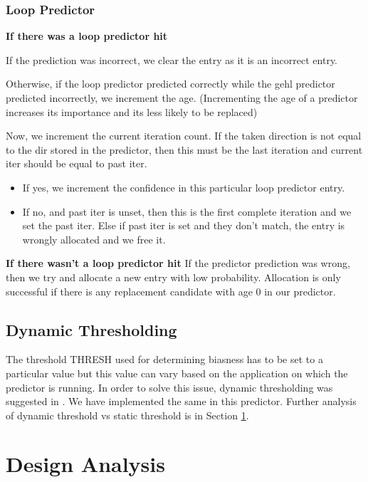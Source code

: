 \documentclass{sig-alternate}
\begin{document}
\subsubsection{Loop Predictor}

\noindent
\textbf{If there was a loop predictor hit}

If the prediction was incorrect, we clear the
entry as it is an incorrect entry.

Otherwise, if the loop predictor predicted correctly while the gehl predictor
predicted incorrectly, we increment the age. (Incrementing the age of a
predictor increases its importance and its less likely to be replaced)

Now, we increment the current iteration count. If the taken direction is not
equal to the dir stored in the predictor, then this must be the last iteration
and current iter should be equal to past iter.
\begin{itemize}
  \item If yes, we increment the confidence in this particular loop predictor entry.
  \item If no, and past iter is unset, then this is the first complete iteration
    and we set the past iter. Else if past iter is set and they don't match, the
    entry is wrongly allocated and we free it.
\end{itemize}

\noindent
\textbf{If there wasn't a loop predictor hit}
If the predictor prediction was wrong, then we try and allocate a new entry with
low probability. Allocation is only successful if there is any replacement
candidate with age 0 in our predictor.

\subsection{Dynamic Thresholding}

The threshold THRESH used for determining biasness has to be set to a particular
value but this value can vary based on the application on which the predictor is
running. In order to solve this issue, dynamic thresholding was suggested in
\cite{ogehl}. We have implemented the same in this predictor. Further analysis
of dynamic threshold vs static threshold is in Section \ref{sec-analysis}.

\section{Design Analysis}
\label{sec-analysis}
\end{document}
